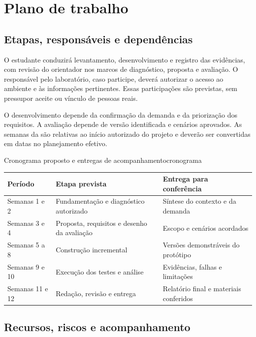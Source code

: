 \chapter{Plano de trabalho}

\section{Etapas, responsáveis e dependências}

O estudante conduzirá levantamento, desenvolvimento e registro das evidências,
com revisão do orientador nos marcos de diagnóstico, proposta e avaliação.
O responsável pelo laboratório, caso participe, deverá autorizar o acesso
ao ambiente e às informações pertinentes. Essas participações são previstas,
sem pressupor aceite ou vínculo de pessoas reais.

O desenvolvimento depende da confirmação da demanda e da priorização dos
requisitos. A avaliação depende de versão identificada e cenários aprovados.
As semanas da  são relativas ao início autorizado do
projeto e deverão ser convertidas em datas no planejamento efetivo.

\begin{undftabela}[H]{Cronograma proposto e entregas de acompanhamento}{cronograma}
  \small
  \begin{tabular}{>{\raggedright\arraybackslash}p{}>{\raggedright\arraybackslash}p{}>{\raggedright\arraybackslash}p{}}
    \hline
    \textbf{Período} & \textbf{Etapa prevista} & \textbf{Entrega para conferência} \\
    \hline
    Semanas 1 e 2 & Fundamentação e diagnóstico autorizado & Síntese do contexto e da demanda \\
    Semanas 3 e 4 & Proposta, requisitos e desenho da avaliação & Escopo e cenários acordados \\
    Semanas 5 a 8 & Construção incremental & Versões demonstráveis do protótipo \\
    Semanas 9 e 10 & Execução dos testes e análise & Evidências, falhas e limitações \\
    Semanas 11 e 12 & Redação, revisão e entrega & Relatório final e materiais conferidos \\
    \hline
  \end{tabular}
\end{undftabela}

\section{Recursos, riscos e acompanhamento}

